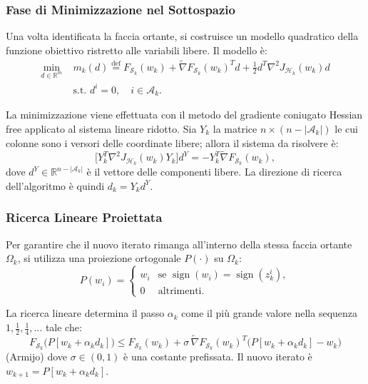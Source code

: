\documentclass[a4paper,12pt]{article}
\numberwithin{equation}{section}
\numberwithin{figure}{section}
\numberwithin{table}{section}
\begin{document}
\subsubsection{Fase di Minimizzazione nel Sottospazio}

Una volta identificata la faccia ortante, si costruisce un modello quadratico
della funzione obiettivo ristretto alle variabili libere. Il modello è:
\begin{equation}
\begin{aligned}
\min_{d \in \mathbb{R}^m} \;& m_k(d) \stackrel{\mathrm{def}}{=}
F_{\mathcal{S}_k}(w_k) + \widetilde{\nabla}F_{\mathcal{S}_k}(w_k)^T d
+ \frac{1}{2} d^T \nabla^2 J_{\mathcal{H}_k}(w_k) d \\
& \text{s.t. } d^i = 0, \quad i \in \mathcal{A}_k.
\end{aligned} \tag{5.47}\label{eq:5_47}
\end{equation}

La minimizzazione viene effettuata con il metodo del gradiente coniugato
Hessian free applicato al sistema lineare ridotto. Sia $Y_k$ la matrice
$n \times (n - |\mathcal{A}_k|)$ le cui colonne sono i versori delle coordinate
libere; allora il sistema da risolvere è:
\begin{equation}
\bigl[ Y_k^T \nabla^2 J_{\mathcal{H}_k}(w_k) Y_k \bigr] d^Y
= -Y_k^T \widetilde{\nabla}F_{\mathcal{S}_k}(w_k), \tag{5.48}\label{eq:5_48}
\end{equation}
dove $d^Y \in \mathbb{R}^{n-|\mathcal{A}_k|}$ è il vettore delle componenti libere.
La direzione di ricerca dell'algoritmo è quindi $d_k = Y_k d^Y$.

\subsubsection{Ricerca Lineare Proiettata}

Per garantire che il nuovo iterato rimanga all'interno della stessa faccia
ortante $\Omega_k$, si utilizza una proiezione ortogonale $P(\cdot)$
su $\Omega_k$:
\begin{equation}
P(w_i) =
\begin{cases}
w_i & \text{se } \operatorname{sign}(w_i) = \operatorname{sign}(z_k^i), \\[4pt]
0   & \text{altrimenti}.
\end{cases} \tag{5.49}\label{eq:5_49}
\end{equation}

La ricerca lineare determina il passo $\alpha_k$ come il più grande valore
nella sequenza $1, \frac{1}{2}, \frac{1}{4}, \dots$ tale che:
\begin{equation}
F_{\mathcal{S}_k}\bigl(P[w_k + \alpha_k d_k]\bigr)
\le F_{\mathcal{S}_k}(w_k)
+ \sigma \, \widetilde{\nabla}F_{\mathcal{S}_k}(w_k)^T
\bigl(P[w_k + \alpha_k d_k] - w_k\bigr)\tag{5.50}\label{eq:5_50}
\end{equation}
(Armijo)
dove $\sigma \in (0,1)$ è una costante prefissata. Il nuovo iterato è
$w_{k+1} = P[w_k + \alpha_k d_k]$.
\end{document}
